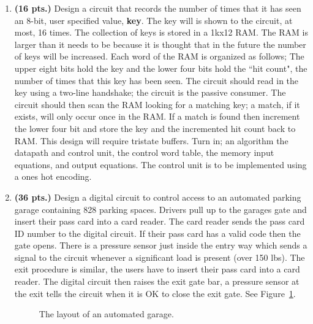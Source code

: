 \begin{enumerate}
\item {\bf (16 pts.)} Design a circuit that records the number of times that it
has seen an 8-bit, user specified value, {\bf key}.  The key will
is shown to the circuit, at most, 16 times.  The collection of 
keys is stored in a 1kx12 RAM.  The RAM is larger
than it needs to be because it is thought that in the future
the number of keys will be increased.  Each word of the RAM is 
organized as follows; The upper eight bits hold the key and the lower
four bits hold the ``hit count", the number of times that this key has
been seen.  The circuit should read in the key using a two-line
handshake; the circuit is the passive consumer.  The circuit
should then scan the RAM looking for a matching key; a match, if
it exists, will only occur once in the RAM.  If a match is 
found then increment the lower four bit and store the key and the
incremented hit count back to RAM.  This design will require tristate 
buffers.
Turn in; an algorithm
the datapath and control unit,
the control word table,
the memory input equations, and
output equations.  
The control unit is to be implemented using a ones hot encoding.

\item {\bf (36 pts.)}
Design a digital circuit to control access to an
automated parking garage containing 828 parking spaces.  
Drivers pull up to the garages gate and insert 
their pass card into a card reader.  The card reader sends the pass card
ID number to the digital circuit.  If their pass card has a valid
code then the gate opens.  There is a pressure sensor just inside the
entry way which sends a signal to the circuit whenever a significant
load is present (over 150 lbs).
The exit procedure is similar, the users have to insert their pass card
into a card reader.  The digital circuit then raises the exit gate bar,
a pressure sensor at the exit tells the circuit when it is OK to close
the exit gate.  See Figure~\ref{fig:Garage}.
\begin{figure}[ht]
\caption{The layout of an automated garage.}
\label{fig:Garage}
\end{figure}


\end{enumerate}
